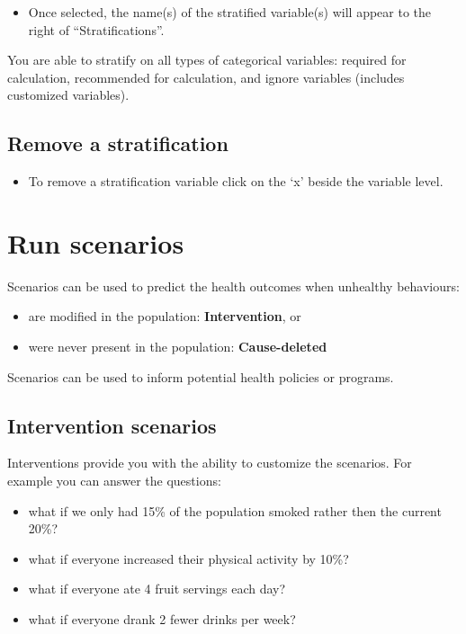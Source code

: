 \documentclass[]{book}
\providecommand{\tightlist}{%
  \setlength{\itemsep}{0pt}\setlength{\parskip}{0pt}}
\begin{document}
\begin{itemize}
\tightlist
\item
  Once selected, the name(s) of the stratified variable(s) will appear
  to the right of ``Stratifications''.
\end{itemize}

You are able to stratify on all types of categorical variables: required
for calculation, recommended for calculation, and ignore variables
(includes customized variables).

\subsection{Remove a stratification}\label{remove-a-stratification}

\begin{itemize}
\tightlist
\item
  To remove a stratification variable click on the `x' beside the
  variable level.
\end{itemize}

\section{Run scenarios}\label{run-scenarios}

Scenarios can be used to predict the health outcomes when unhealthy
behaviours:

\begin{itemize}
\tightlist
\item
  are modified in the population: \textbf{Intervention}, or
\item
  were never present in the population: \textbf{Cause-deleted}
\end{itemize}

Scenarios can be used to inform potential health policies or programs.

\subsection{Intervention scenarios}\label{intervention-scenarios}

Interventions provide you with the ability to customize the scenarios.
For example you can answer the questions:

\begin{itemize}
\tightlist
\item
  what if we only had 15\% of the population smoked rather then the
  current 20\%?
\item
  what if everyone increased their physical activity by 10\%?
\item
  what if everyone ate 4 fruit servings each day?
\item
  what if everyone drank 2 fewer drinks per week?
\end{itemize}
\end{document}
